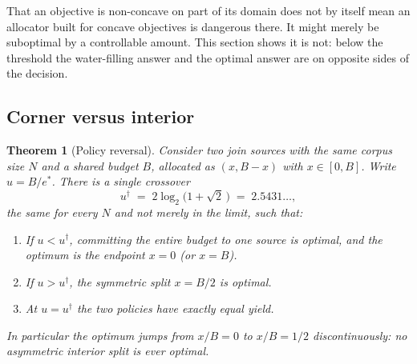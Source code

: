 \documentclass[11pt,twocolumn,a4paper]{article}
\theoremstyle{thmstyle}
\newtheorem{theorem}{Theorem}[section]
\theoremstyle{definition}
\theoremstyle{remark}
\newcommand{\estar}{e^{*}}
\newcommand{\ucross}{u^{\dagger}}
\begin{document}
That an objective is non-concave on part of its domain does not by itself
mean an allocator built for concave objectives is dangerous there. It
might merely be suboptimal by a controllable amount. This section shows
it is not: below the threshold the water-filling answer and the optimal
answer are on opposite sides of the decision.

\subsection{Corner versus interior}

\begin{theorem}[Policy reversal]
\label{thm:reversal}
Consider two join sources with the same corpus size $N$ and a shared
budget $B$, allocated as $(x, B-x)$ with $x\in[0,B]$. Write
$u=B/\estar$. There is a single crossover
\begin{equation}
\ucross \;=\; 2\log_2\!\bigl(1+\sqrt2\,\bigr)\;=\;2.5431\ldots,
\label{eq:ucross}
\end{equation}
the same for every $N$ and not merely in the limit, such that:
\begin{enumerate}[label=(\alph*),leftmargin=1.8em,itemsep=2pt]
\item If $u<\ucross$, committing the entire budget to one source is
optimal, and the optimum is the endpoint $x=0$ (or $x=B$).
\item If $u>\ucross$, the symmetric split $x=B/2$ is optimal.
\item At $u=\ucross$ the two policies have exactly equal yield.
\end{enumerate}
In particular the optimum jumps from $x/B=0$ to $x/B=1/2$
discontinuously: no asymmetric interior split is ever optimal.
\end{theorem}
\end{document}

